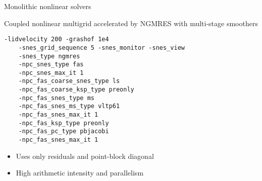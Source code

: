 \begin{frame}[fragile]{Monolithic nonlinear solvers}
  \begin{block}{Coupled nonlinear multigrid accelerated by NGMRES with multi-stage smoothers}
  \begin{Verbatim}[formatcom=\footnotesize]
    -lidvelocity 200 -grashof 1e4
    -snes_grid_sequence 5 -snes_monitor -snes_view
    -snes_type ngmres
    -npc_snes_type fas
    -npc_snes_max_it 1
    -npc_fas_coarse_snes_type ls
    -npc_fas_coarse_ksp_type preonly
    -npc_fas_snes_type ms
    -npc_fas_snes_ms_type vltp61
    -npc_fas_snes_max_it 1
    -npc_fas_ksp_type preonly
    -npc_fas_pc_type pbjacobi
    -npc_fas_snes_max_it 1
  \end{Verbatim}
  \begin{itemize}
  \item Uses only residuals and point-block diagonal
  \item High arithmetic intensity and parallelism
  \end{itemize}
\end{block}
\end{frame}
